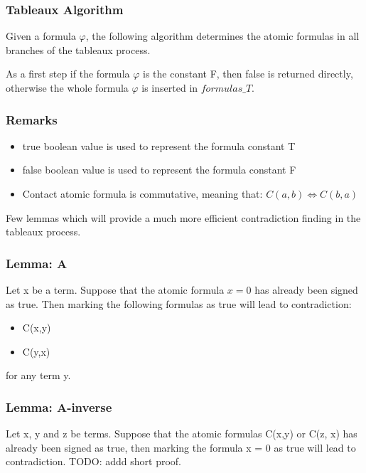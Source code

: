 \documentclass{article}
\begin{document}
	\subsubsection*{Tableaux Algorithm}
	Given a formula $\varphi$, the following algorithm determines the atomic formulas in all branches of the tableaux process.

	As a first step if the formula $\varphi$ is the constant F, then false is returned directly, otherwise the whole formula $\varphi$ is inserted in $formulas\_T$.
	\newline
	\subsubsection*{Remarks}
	\begin{itemize}
		\item true boolean value is used to represent the formula constant T
		\item false boolean value is used to represent the formula constant F
		\item Contact atomic formula is commutative, meaning that: $C(a,b) \iff C(b,a)$
	\end{itemize}

	Few lemmas which will provide a much more efficient contradiction finding in the tableaux process.
	\subsubsection*{Lemma: A}
	Let x be a term. Suppose that the atomic formula $x = 0$ has already been signed as true.
	Then marking the following formulas as true will lead to contradiction:
	\begin{itemize}
		\item C(x,y)
		\item C(y,x)
	\end{itemize}
	for any term y.

	\subsubsection*{Lemma: A-inverse}
	Let x, y and z be terms. Suppose that the atomic formulas C(x,y) or C(z, x) has already been signed as true, then marking the formula x = 0 as true will lead to contradiction.
	\newline
	TODO: addd short proof.
\end{document}
